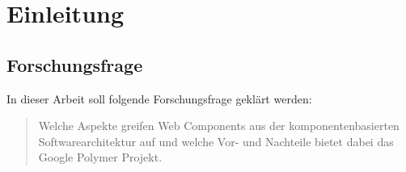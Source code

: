 \section{Einleitung}
\label{sec:1_Einführung}




\subsection{Forschungsfrage}
\label{sec:1_Forschungsfrage}
In dieser Arbeit soll folgende Forschungsfrage geklärt werden:
\begin{quote}
Welche Aspekte greifen Web Components aus der komponentenbasierten Softwarearchitektur auf und welche Vor- und Nachteile bietet dabei das Google Polymer Projekt.
\end{quote}


